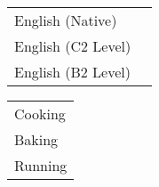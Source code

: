 \documentclass[a4paper,10pt]{article}
\begin{document}
\vspace{20pt}
\MyHorizontalRule %
\vspace{-3pt}
\begin{multicols}{2}
    
\hspace{85pt}
\MyHorizontalRule %
\vspace{1pt}
\begin{center}
    \begin{tabular}{ll}
    	English (Native) 		& \SkillBull{$\bullet \bullet \bullet \, \bullet$}\\
    	English (C2 Level) 		& \SkillBull{$\bullet \bullet \bullet \, \circ$}\\
    	English (B2 Level) 		& \SkillBull{$\bullet \bullet \circ \, \circ$}\\
    \end{tabular}
\end{center}

\hspace{35pt}
\vspace{1pt}
\begin{center}
    \begin{tabular}{l}
        \hspace{-90pt}Cooking \\
        \hspace{-90pt}Baking\\
        \hspace{-90pt}Running\\
    \end{tabular}
\end{center}
\end{multicols}

\end{document}
